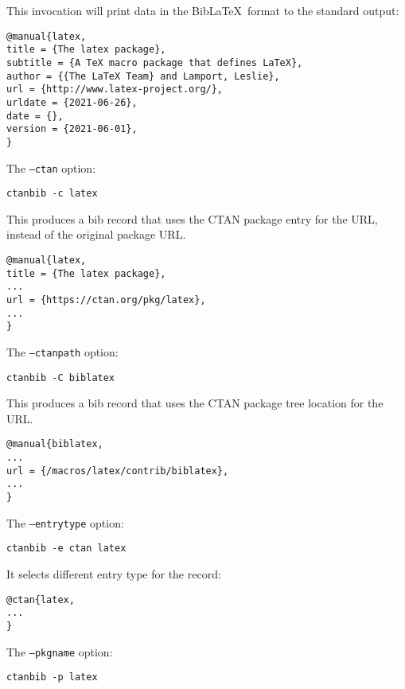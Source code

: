\documentclass{ltxdoc}
\begin{document}
\noindent This invocation will print data in the Bib\LaTeX\ format to the standard output:

\begin{verbatim}
@manual{latex,
title = {The latex package},
subtitle = {A TeX macro package that defines LaTeX},
author = {{The LaTeX Team} and Lamport, Leslie},
url = {http://www.latex-project.org/},
urldate = {2021-06-26},
date = {},
version = {2021-06-01},
}
\end{verbatim}

\noindent The \texttt{--ctan} option:

\begin{verbatim}
ctanbib -c latex
\end{verbatim}

\noindent This produces a bib record that uses the CTAN package entry for the URL, 
instead of the original package URL.


\begin{verbatim}
@manual{latex,
title = {The latex package},
...
url = {https://ctan.org/pkg/latex},
...
}
\end{verbatim}

\noindent The \texttt{--ctanpath} option:

\begin{verbatim}
ctanbib -C biblatex
\end{verbatim}

\noindent This produces a bib record that uses the CTAN package tree location for the URL.

\begin{verbatim}
@manual{biblatex,
...
url = {/macros/latex/contrib/biblatex},
...
}
\end{verbatim}



\noindent The \texttt{--entrytype} option:

\begin{verbatim}
ctanbib -e ctan latex
\end{verbatim}

\noindent It selects different entry type for the record:

\begin{verbatim}
@ctan{latex,
...
}
\end{verbatim}

\noindent The \texttt{--pkgname} option:

\begin{verbatim}
ctanbib -p latex
\end{verbatim}
\end{document}
